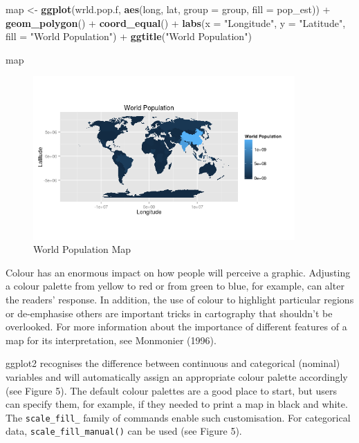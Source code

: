 \documentclass[]{article}
\newenvironment{Shaded}{}{}
\newcommand{\KeywordTok}[1]{\textcolor[rgb]{0.00,0.44,0.13}{\textbf{{#1}}}}
\newcommand{\DataTypeTok}[1]{\textcolor[rgb]{0.56,0.13,0.00}{{#1}}}
\newcommand{\StringTok}[1]{\textcolor[rgb]{0.25,0.44,0.63}{{#1}}}
\newcommand{\NormalTok}[1]{{#1}}
\let\Oldincludegraphics\includegraphics
\renewcommand{\includegraphics}[1]{\Oldincludegraphics[width=10cm]{#1}}
\begin{document}
\begin{Shaded}
\begin{Highlighting}[]
\NormalTok{map <- }\KeywordTok{ggplot}\NormalTok{(wrld.pop.f, }\KeywordTok{aes}\NormalTok{(long, lat, }\DataTypeTok{group =} \NormalTok{group, }\DataTypeTok{fill =} \NormalTok{pop_est)) + }\KeywordTok{geom_polygon}\NormalTok{() + }
    \KeywordTok{coord_equal}\NormalTok{() + }\KeywordTok{labs}\NormalTok{(}\DataTypeTok{x =} \StringTok{"Longitude"}\NormalTok{, }\DataTypeTok{y =} \StringTok{"Latitude"}\NormalTok{, }\DataTypeTok{fill =} \StringTok{"World Population"}\NormalTok{) + }
    \KeywordTok{ggtitle}\NormalTok{(}\StringTok{"World Population"}\NormalTok{)}

\NormalTok{map}
\end{Highlighting}
\end{Shaded}
\begin{figure}[htbp]
\centering
\includegraphics{figure/World_Population_Map.png}
\caption{World Population Map}
\end{figure}

Colour has an enormous impact on how people will perceive a graphic.
Adjusting a colour palette from yellow to red or from green to blue, for
example, can alter the readers' response. In addition, the use of colour
to highlight particular regions or de-emphasise others are important
tricks in cartography that shouldn't be overlooked. For more
information about the importance of different features of a map for its
interpretation, see Monmonier (1996).

ggplot2 recognises the difference between continuous and categorical
(nominal) variables and will automatically assign an appropriate colour
palette accordingly (see Figure 5). The default colour palettes are a
good place to start, but users can specify them, for example, if they needed to print a  map in black and white. The
\texttt{scale\_fill\_} family of commands enable such customisation. For
categorical data, \texttt{scale\_fill\_manual()} can be used (see Figure 5).
\end{document}
